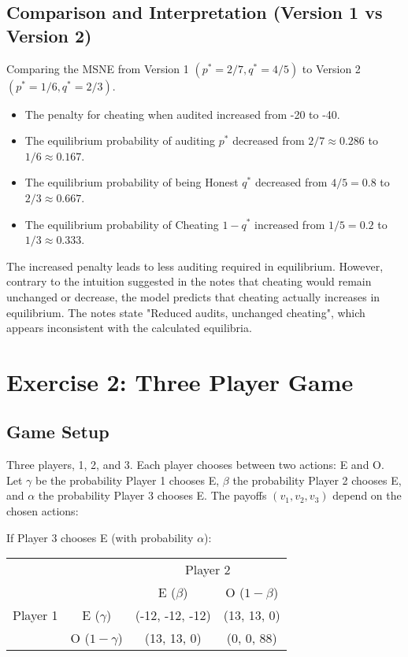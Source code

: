 \documentclass{article}
\begin{document}
\subsection{Comparison and Interpretation (Version 1 vs Version 2)}
Comparing the MSNE from Version 1 $(p^*=2/7, q^*=4/5)$ to Version 2 $(p^*=1/6, q^*=2/3)$.
\begin{itemize}
    \item The penalty for cheating when audited increased from -20 to -40.
    \item The equilibrium probability of auditing $p^*$ decreased from $2/7 \approx 0.286$ to $1/6 \approx 0.167$.
    \item The equilibrium probability of being Honest $q^*$ decreased from $4/5 = 0.8$ to $2/3 \approx 0.667$.
    \item The equilibrium probability of Cheating $1-q^*$ increased from $1/5 = 0.2$ to $1/3 \approx 0.333$.
\end{itemize}
The increased penalty leads to less auditing required in equilibrium. However, contrary to the intuition suggested in the notes that cheating would remain unchanged or decrease, the model predicts that cheating actually increases in equilibrium. The notes state "Reduced audits, unchanged cheating", which appears inconsistent with the calculated equilibria.

\section{Exercise 2: Three Player Game}

\subsection{Game Setup}
Three players, 1, 2, and 3. Each player chooses between two actions: E and O.
Let $\gamma$ be the probability Player 1 chooses E, $\beta$ the probability Player 2 chooses E, and $\alpha$ the probability Player 3 chooses E.
The payoffs $(v_1, v_2, v_3)$ depend on the chosen actions:

If Player 3 chooses E (with probability $\alpha$):
\begin{center}
\begin{tabular}{cc|c|c|}
\multicolumn{2}{c}{ } & \multicolumn{2}{c}{Player 2} \\
\multicolumn{2}{c}{ } & \multicolumn{1}{c}{E ($\beta$)} & \multicolumn{1}{c}{O ($1-\beta$)} \\ \cline{3-4}
  Player 1 & E ($\gamma$) & (-12, -12, -12) & (13, 13, 0) \\ \cline{3-4}
  & O ($1-\gamma$) & (13, 13, 0) & (0, 0, 88) \\ \cline{3-4}
\end{tabular}
\end{center}
\end{document}
